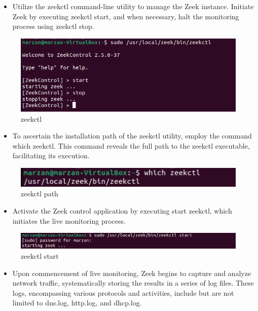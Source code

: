 \begin{itemize}
    \item Utilize the zeekctl command-line utility to manage the Zeek instance. Initiate Zeek by executing zeekctl start, and when necessary, halt the monitoring process using zeekctl stop.
\end{itemize}


\begin{figure}[H]
    \centering
    \includegraphics[width=1\linewidth]{images/live_monitor/zeekctl.png}
    \caption{zeekctl}
    \label{fig:enter-label}
\end{figure}

\begin{itemize}
    \item To ascertain the installation path of the zeekctl utility, employ the command which zeekctl. This command reveals the full path to the zeekctl executable, facilitating its execution.
\end{itemize}


\begin{figure}[H]
    \centering
    \includegraphics[width=1\linewidth]{images/live_monitor/which zeekctl.png}
    \caption{zeekctl path}
    \label{fig:enter-label}
\end{figure}

\begin{itemize}
    \item Activate the Zeek control application by executing start zeekctl, which initiates the live monitoring process.
\end{itemize}

\begin{figure}[H]
    \centering
    \includegraphics[width=1\linewidth]{images/live_monitor/zeetctl_start.png}
    \caption{zeekctl start}
    \label{fig:enter-label}
\end{figure}
\begin{itemize}
    \item Upon commencement of live monitoring, Zeek begins to capture and analyze network traffic, systematically storing the results in a series of log files. These logs, encompassing various protocols and activities, include but are not limited to dns.log, http.log, and dhcp.log.
\end{itemize}

